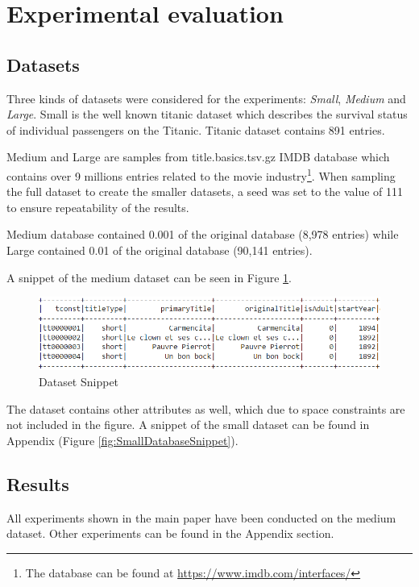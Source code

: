 \documentclass[sigconf]{acmart}
\begin{document}
\section{Experimental evaluation}

\subsection{Datasets}
Three kinds of datasets were considered for the experiments: \textit{Small}, \textit{Medium} and \textit{Large}. Small is the well known titanic dataset which describes the survival status of individual passengers
on the Titanic. Titanic dataset contains 891 entries.

Medium and Large are samples from title.basics.tsv.gz IMDB database which contains over 9 millions entries related to the movie industry\footnote{The database can be found at \href{https://www.imdb.com/interfaces/}{https://www.imdb.com/interfaces/}}. When sampling the full dataset to create the smaller datasets, a seed was set to the value of 111 to ensure repeatability of the results.

Medium database contained 0.001 of the original database (8,978 entries) while Large contained 0.01 of the original database (90,141 entries).

A snippet of the medium dataset can be seen in Figure \ref{fig:DatasetSnippet}.
\begin{figure}[h!]
    \centering
    \includegraphics[scale=0.4]{images/DatabaseSnippet.png}
    \caption{Dataset Snippet}
    \label{fig:DatasetSnippet}
\end{figure}
The dataset contains other attributes as well, which due to space constraints are not included in the figure. A snippet of the small dataset can be found in Appendix (Figure \ref{fig:SmallDatabaseSnippet}).


\subsection{Results}\label{Results}
All experiments shown in the main paper have been conducted on the medium dataset. Other experiments can be found in the Appendix section.
\end{document}
